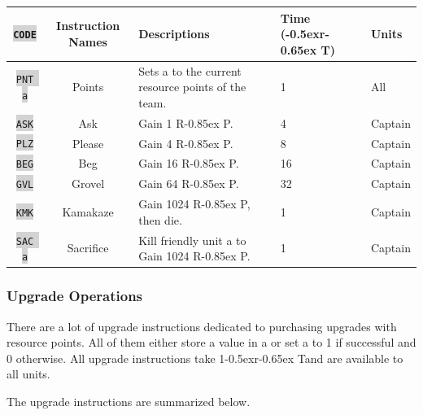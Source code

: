 \documentclass{article}
\newcommand{\vnscode}[1]{\colorbox{lightgray}{\lstinline[language=vns]{#1}}}
\newcommand{\RT}{\lower-0.5ex\hbox{r}\kern-0.65ex T}
\newcommand{\RP}{R\kern-0.85ex P}
\begin{document}
\begin{minipage}{\textwidth}
\label{table:resource}
\centering
\begin{tabular}{|c|c|l|l|l|}
    \hline \vnscode{CODE} & Instruction Names & Descriptions & Time (\RT) & Units \\ \hline
    \vnscode{PNT a} & Points & Sets a to the current resource points of the team. & 1 & All \\ \hline
    \vnscode{ASK} & Ask & Gain 1 \RP. & 4 & Captain \\ \hline
    \vnscode{PLZ} & Please & Gain 4 \RP. & 8 & Captain \\ \hline
    \vnscode{BEG} & Beg & Gain 16 \RP. & 16 & Captain \\ \hline
    \vnscode{GVL} & Grovel & Gain 64 \RP. & 32 & Captain \\ \hline
    \vnscode{KMK} & Kamakaze & Gain 1024 \RP, then die. & 1 & Captain \\ \hline
    \vnscode{SAC a} & Sacrifice & Kill friendly unit a to Gain 1024 \RP. & 1 & Captain \\ \hline
\end{tabular}
\end{minipage}

\subsubsection{Upgrade Operations}

There are a lot of upgrade instructions dedicated to purchasing upgrades with
resource points. All of them either store a value in a or set a to 1 if
successful and 0 otherwise. All upgrade instructions take 1\RT and are available
to all units.

The upgrade instructions are summarized below.
\end{document}
